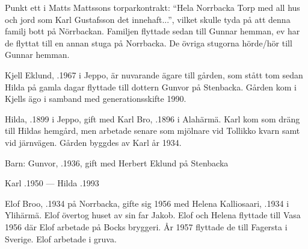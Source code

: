 Punkt ett i Matts Mattssons torparkontrakt: ``Hela Norrbacka Torp med all hus och jord som Karl Gustafsson det innehaft...'', vilket skulle tyda på att denna familj bott på Nörrbackan. Familjen flyttade sedan till Gunnar hemman, ev har de flyttat till en annan stuga på Norrbacka. De övriga stugorna hörde/hör till Gunnar hemman.



%



%
Kjell Eklund, .1967 i Jeppo, är nuvarande ägare till gården, som stått tom sedan Hilda på gamla dagar flyttade till dottern Gunvor på Stenbacka. Gården kom i Kjells ägo i samband med generationsskifte 1990.\jhvspace{}


%
Hilda, .1899 i Jeppo, gift med Karl Bro, .1896 i Alahärmä. Karl kom som dräng till Hildas hemgård, men arbetade senare som mjölnare vid Tollikko kvarn samt vid järnvägen. Gården byggdes av Karl år 1934.

Barn: Gunvor, .1936, gift med Herbert Eklund på Stenbacka

Karl .1950  ---  Hilda .1993



%



%
Elof Broo, .1934 på Norrbacka, gifte sig 1956 med Helena Kalliosaari, .1934 i Ylihärmä. Elof övertog huset av sin far Jakob. Elof och Helena flyttade till Vasa 1956 där Elof arbetade på Bocks bryggeri. År 1957 flyttade de till Fagersta i Sverige. Elof arbetade i gruva.
\begin{jhchildren}
  \item {}
  \item {}
  \item {}
  \item {}
\end{jhchildren}

